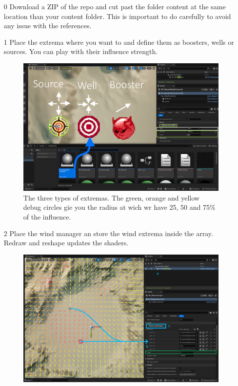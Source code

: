 \documentclass[../main.tex]{subfile}
\begin{document}
    \begin{itemize}
        \item[0] Download a ZIP of the repo and cut past the folder content at the same location than your content folder.
         This is important to do carefully to avoid any issue with the references.
        \item[1] Place the extrema where you want to and define them as boosters, wells or sources. You can play with their influence strength.
        \begin{figure}[H]
            \centering
            \includegraphics[width=1\textwidth]{Ressources/WindExtrema.png}
            \caption{The three types of extremas. The green, orange and yellow debug circles gie you the radius at wich wr have 25, 50 and 75\% of the influence.}
        \end{figure}
        \item[2] Place the wind manager an store the wind extrema inside the array. Redraw and reshape updates the shaders.
        \begin{figure}[H]
            \centering
            \includegraphics[width=1\textwidth]{Ressources/WindManager.png}

\end{figure}
\end{itemize}
\end{document}
